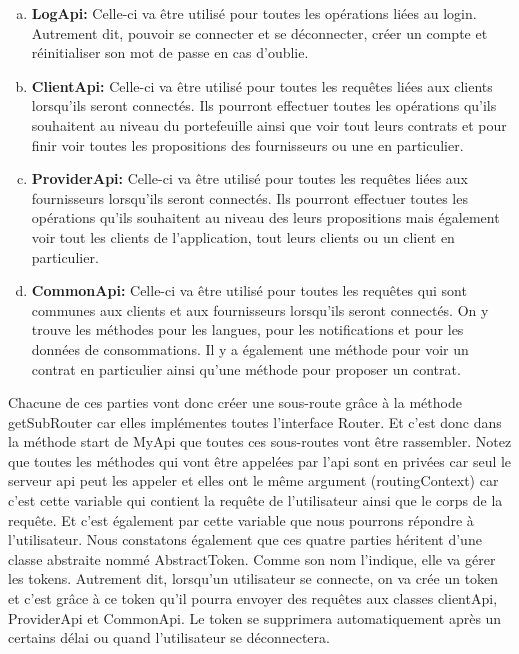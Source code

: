 \begin{enumerate}[a)]
\item \textbf{LogApi:}\newline
Celle-ci va être utilisé pour toutes les opérations liées au login. Autrement dit, pouvoir se connecter et se déconnecter, créer un compte et réinitialiser son mot de passe en cas d'oublie.
\item \textbf{ClientApi:}\newline
Celle-ci va être utilisé pour toutes les requêtes liées aux clients lorsqu'ils seront connectés. Ils pourront effectuer toutes les opérations qu'ils souhaitent au niveau du portefeuille ainsi que voir tout leurs contrats et pour finir voir toutes les propositions des fournisseurs ou une en particulier.
\item \textbf{ProviderApi:}\newline
Celle-ci va être utilisé pour toutes les requêtes liées aux fournisseurs lorsqu'ils seront connectés. Ils pourront effectuer toutes les opérations qu'ils souhaitent au niveau des leurs propositions mais également voir tout les clients de l'application, tout leurs clients ou un client en particulier.
\item \textbf{CommonApi:}\newline
Celle-ci va être utilisé pour toutes les requêtes qui sont communes aux clients et aux fournisseurs lorsqu'ils seront connectés. On y trouve les méthodes pour les langues, pour les notifications et pour les données de consommations. Il y a également une méthode pour voir un contrat en particulier ainsi qu'une méthode pour proposer un contrat.
\end{enumerate}

\newpage

\begin{flushleft}
Chacune de ces parties vont donc créer une sous-route grâce à la méthode getSubRouter car elles implémentes toutes l'interface Router. Et c'est donc dans la méthode start de MyApi que toutes ces sous-routes vont être rassembler.
\newline
Notez que toutes les méthodes qui vont être appelées par l'api sont en privées car seul le serveur api peut les appeler et elles ont  le même argument (routingContext) car c'est cette variable qui contient la requête de l'utilisateur ainsi que le corps de la requête. Et c'est également par cette variable que nous pourrons répondre à l'utilisateur.
\newline
Nous constatons également que ces quatre parties héritent d'une classe abstraite nommé AbstractToken. Comme son nom l'indique, elle va gérer les tokens. Autrement dit, lorsqu'un utilisateur se connecte, on va crée un token et c'est grâce à ce token qu'il pourra envoyer des requêtes aux classes clientApi, ProviderApi et CommonApi. Le token se supprimera automatiquement après un certains délai ou quand l'utilisateur se déconnectera.
\end{flushleft}

